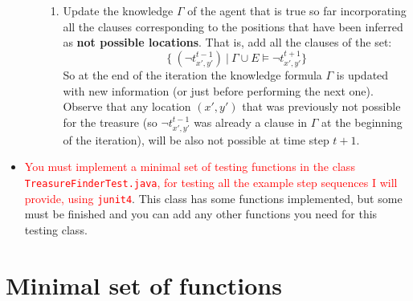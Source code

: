 \documentclass{tufte-handout}
\begin{document}
\begin{fullwidth}
\begin{itemize}
\begin{enumerate}
\begin{enumerate}
\item Update the knowledge $\Gamma$ of the agent that
is true so far  incorporating
all the clauses corresponding to the positions that have been
 inferred as {\bf not possible locations}. That is, add all the
clauses of the set:
$$
 \{ \ (\neg t_{x',y'}^{t-1}) \ | \ \Gamma \cup E
    \models \neg  t_{x',y'}^{t+1} \} $$
So at the end of the iteration the knowledge formula $\Gamma$ is
updated with new information (or just before performing the next one).
Observe that any location $(x',y')$ that was previously not possible for the treasure
(so $ \neg t_{x',y'}^{t-1} $ was already a clause in $\Gamma$ at the beginning of
the iteration), will be also not possible at time step $t+1$.
\end{enumerate}
\end{enumerate}
\item  \textcolor{red}{You must implement a minimal set of testing functions in the class
{\tt TreasureFinderTest.java}, for testing all the example step sequences I will provide,
 using {\tt junit4}}. This class has some functions
implemented, but some must be finished and you can add any other functions you need for this
testing class.
\end{itemize}
\end{fullwidth}

\section{Minimal set of functions}
\end{document}

